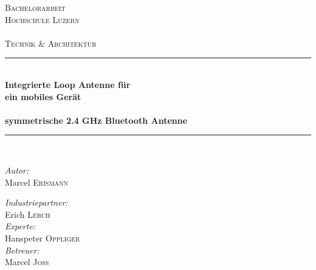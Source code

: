 \begin{titlepage}

\begin{center}

\textsc{\LARGE Bachelorarbeit}\\[1.5cm]

\textsc{\Large Hochschule Luzern\\
    ~\\
    Technik \& Architektur}\\[0.5cm]

\vfill{}

\newcommand{\HRule}{\rule{\linewidth}{0.5mm}}
\HRule \\[0.4cm]
{   \Huge \bfseries Integrierte Loop Antenne für \\ein mobiles Gerät\\
        ~\\
        \large symmetrische 2.4 GHz Bluetooth Antenne}\\[0.4cm]

\HRule \\[1.5cm]

\begin{minipage}{0.4\textwidth}
    \begin{flushleft} \large
        \emph{Autor:}\\
        Marcel \textsc{Erismann}\\
    \end{flushleft}
\end{minipage}
\hfill
\begin{minipage}{0.4\textwidth}
    \begin{flushright} \large
          \emph{Industriepartner:} \\
         Erich \textsc{Lerch}\\
         \vspace{0.5cm}
         \emph{Experte:} \\
         Hanspeter  \textsc{Oppliger}\\
         \vspace{0.5cm}
         \emph{Betreuer:} \\
         Marcel  \textsc{Joss}
    \end{flushright}
\end{minipage}


\end{center}
\end{titlepage}
